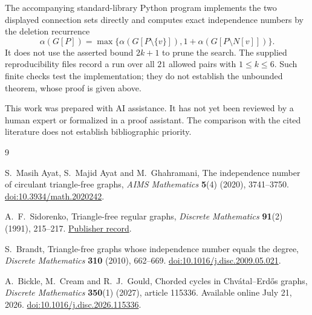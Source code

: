 \documentclass[11pt]{article}
\begin{document}
The accompanying standard-library Python program implements the two
displayed connection sets directly and computes exact independence
numbers by the deletion recurrence
\[
\alpha(G[P])=\max\bigl\{\alpha(G[P\setminus\{v\}]),
  1+\alpha(G[P\setminus N[v]])\bigr\}.
\]
It does not use the asserted bound \(2k+1\) to prune the search.
The supplied reproducibility files record a run over all \(21\) allowed
pairs with \(1\le k\le6\).
Such finite checks test the implementation; they do not establish the
unbounded theorem, whose proof is given above.

This work was prepared with AI assistance.
It has not yet been reviewed by a human expert or formalized in a proof
assistant. The comparison with the cited literature does not establish
bibliographic priority.

\begin{thebibliography}{9}
\raggedright
{}
S.~Masih Ayat, S.~Majid Ayat and M.~Ghahramani,
The independence number of circulant triangle-free graphs,
\emph{AIMS Mathematics} \textbf{5}(4) (2020), 3741--3750.
\href{https://doi.org/10.3934/math.2020242}{doi:10.3934/math.2020242}.

A.~F.~Sidorenko,
Triangle-free regular graphs,
\emph{Discrete Mathematics} \textbf{91}(2) (1991), 215--217.
\href{https://www.sciencedirect.com/science/article/pii/0012365X9190114H}{Publisher record}.

S.~Brandt,
Triangle-free graphs whose independence number equals the degree,
\emph{Discrete Mathematics} \textbf{310} (2010), 662--669.
\href{https://doi.org/10.1016/j.disc.2009.05.021}{doi:10.1016/j.disc.2009.05.021}.

A.~Bickle, M.~Cream and R.~J.~Gould,
Chorded cycles in Chv\'atal--Erd\H{o}s graphs,
\emph{Discrete Mathematics} \textbf{350}(1) (2027), article 115336.
Available online July 21, 2026.
\href{https://doi.org/10.1016/j.disc.2026.115336}{doi:10.1016/j.disc.2026.115336}.
\end{thebibliography}
\end{document}
